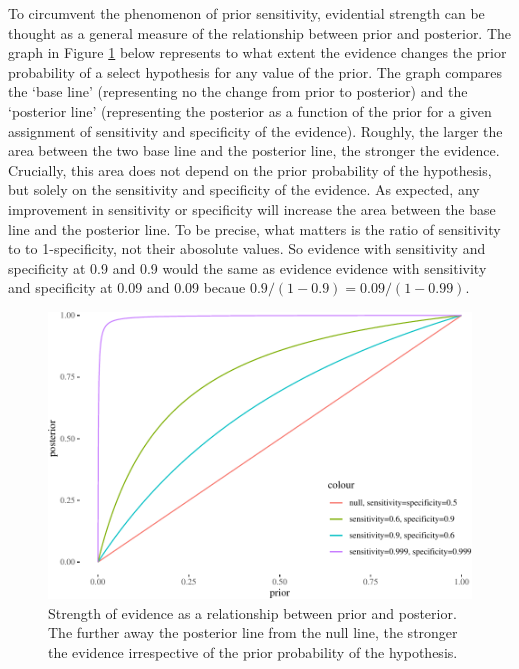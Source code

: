 \documentclass[10pt,dvipsnames,enabledeprecatedfontcommands]{scrartcl}
\begin{document}
To circumvent the phenomenon of prior sensitivity, evidential strength
can be thought as a general measure of the relationship between prior
and posterior. The graph in Figure \ref{fig:strength-prior-post} below
represents to what extent the evidence changes the prior probability of
a select hypothesis for any value of the prior. The graph compares the
`base line' (representing no the change from prior to posterior) and the
`posterior line' (representing the posterior as a function of the prior
for a given assignment of sensitivity and specificity of the evidence).
Roughly, the larger the area between the two base line and the posterior
line, the stronger the evidence. Crucially, this area does not depend on
the prior probability of the hypothesis, but solely on the sensitivity
and specificity of the evidence. As expected, any improvement in
sensitivity or specificity will increase the area between the base line
and the posterior line. To be precise, what matters is the ratio of
sensitivity to to 1-specificity, not their abosolute values. So evidence
with sensitivity and specificity at 0.9 and 0.9 would the same as
evidence evidence with sensitivity and specificity at 0.09 and 0.09
becaue \(0.9/(1-0.9) = 0.09/(1-0.99)\).

\begin{figure}


\begin{center}\includegraphics[width=0.9\linewidth]{conjunction-paradox_files/figure-latex/unnamed-chunk-12-1} \end{center}

\caption{Strength of evidence as a relationship between prior and posterior. 
The further away the posterior line from the null line, the stronger the evidence irrespective 
of the prior probability of the hypothesis.}
\label{fig:strength-prior-post}
\end{figure}
\end{document}
